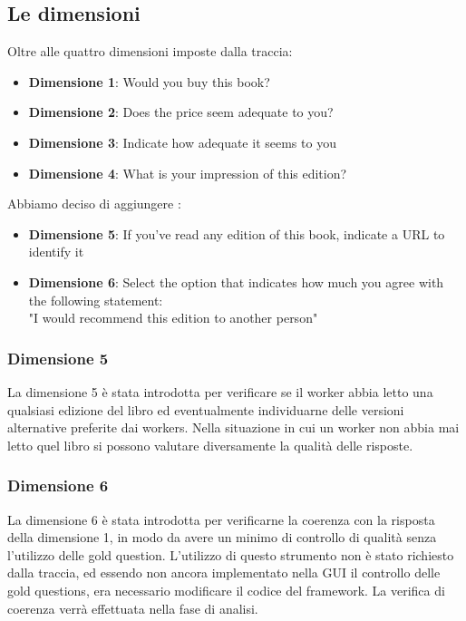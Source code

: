 \documentclass[a4paper,11pt]{report}
\begin{document}
\subsection{Le dimensioni}
Oltre alle quattro dimensioni imposte dalla traccia:
\begin{itemize}
	\item \textbf{Dimensione 1}: Would you buy this book?
	\item \textbf{Dimensione 2}: Does the price seem adequate to you?
	\item \textbf{Dimensione 3}: Indicate how adequate it seems to you
	\item \textbf{Dimensione 4}: What is your impression of this edition?
\end{itemize}
Abbiamo deciso di aggiungere :
\begin{itemize}
	\item \textbf{Dimensione 5}: If you've read any edition of this book, indicate a URL to identify it
	\item \textbf{Dimensione 6}: Select the option that indicates how much you agree with the following statement: \\ "I would recommend this edition to another person"
\end{itemize}
\subsubsection{Dimensione 5}
La dimensione 5 è stata introdotta per verificare se il worker abbia letto una qualsiasi edizione del libro ed eventualmente individuarne delle versioni alternative preferite dai workers. Nella situazione in cui un worker non abbia mai letto quel libro si possono valutare diversamente la qualità delle risposte.   
\subsubsection{Dimensione 6}
La dimensione 6 è stata introdotta per verificarne la coerenza con la risposta della dimensione  1, in modo da avere un minimo di controllo di qualità senza l'utilizzo delle gold question. L'utilizzo di questo strumento non è stato richiesto dalla traccia, ed essendo non ancora implementato nella GUI il controllo delle gold questions, era necessario modificare il codice del framework. La verifica di coerenza verrà effettuata nella fase di analisi.
\end{document}
